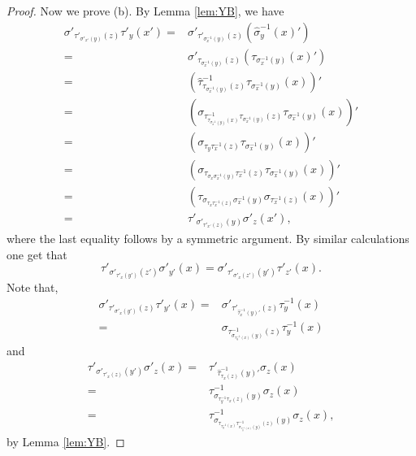 \begin{proof}
Now we prove (b). By Lemma \ref{lem:YB}, we have
\begin{align*}
    \sigma'_{\tau'_{\sigma'_{x'}(y)}(z)}\tau'_y(x')=&
    \sigma'_{\tau'_{\sigma^{-1}_{x}(y)}(z)}\left(\widehat{\sigma}^{-1}_y(x)'\right)\\
    =&
    \sigma'_{\tau_{\sigma^{-1}_{x}(y)}(z)}\left(\tau_{\sigma^{-1}_x(y)}(x)'\right)\\
    =&
    \left(\widehat{\tau}^{-1}_{\tau_{\sigma^{-1}_{x}(y)}(z)}\tau_{\sigma^{-1}_x(y)}(x)\right)'\\
     =&
    \left(\sigma_{\tau^{-1}_{\tau_{\sigma^{-1}_x(y)}(x)}\tau_{\sigma^{-1}_{x}(y)}(z)}\tau_{\sigma^{-1}_x(y)}(x)\right)'\\
    =&
    \left(\sigma_{\tau_{y}\tau^{-1}_{x}(z)}\tau_{\sigma^{-1}_x(y)}(x)\right)'\\
    =&
    \left(\sigma_{\tau_{\sigma_x\sigma^{-1}_x(y)}\tau^{-1}_{x}(z)}\tau_{\sigma^{-1}_x(y)}(x)\right)'\\
    =&
    \left(\tau_{\sigma_{\tau_x\tau^{-1}_x(z)}\sigma^{-1}_{x}(y)}\sigma_{\tau^{-1}_x(z)}(x)\right)'\\
    =&\tau'_{\sigma'_{\tau'_{x'}(z)}(y)}\sigma'_z(x'),
\end{align*}
where the last equality follows by a symmetric argument. By similar calculations one get that
\[\tau'_{\sigma'_{\tau'_x(y')}(z')}\sigma'_{y'}(x)=\sigma'_{\tau'_{\sigma'_x(z')}(y')}\tau'_{z'}(x).\]
Note that, 
\begin{align*}
    \sigma'_{\tau'_{\sigma'_x(y')}(z)}\tau'_{y'}(x)=&\sigma'_{\tau'_{\widehat{\tau}^{-1}_x(y)'}(z)}\tau^{-1}_y(x)\\
    =&\sigma_{\tau^{-1}_{\sigma_{\tau^{-1}_y(x)}(y)}(z)}\tau^{-1}_y(x)
\end{align*}
and
\begin{align*}
    \tau'_{\sigma'_{\tau'_x(z)}(y')}\sigma'_{z}(x)
    =&\tau'_{\widehat{\tau}^{-1}_{\tau_x(z)}(y)'}\sigma_z(x)\\
    =&\tau^{-1}_{\sigma_{\tau^{-1}_y\tau_x(z)}(y)}\sigma_z(x)\\
    =&\tau^{-1}_{\sigma_{\tau_{\tau^{-1}_y(x)}\tau^{-1}_{\sigma_{\tau^{-1}_y(x)}(y)}(z)}(y)}\sigma_z(x),
\end{align*}
by Lemma \ref{lem:YB}.


\end{proof}
